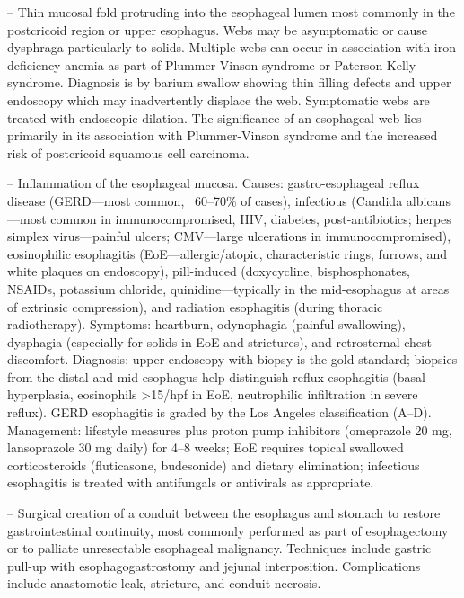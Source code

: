 -- Thin mucosal fold protruding into the esophageal lumen most commonly in the postcricoid region or upper esophagus. Webs may be asymptomatic or cause dysphraga particularly to solids. Multiple webs can occur in association with iron deficiency anemia as part of Plummer-Vinson syndrome or Paterson-Kelly syndrome. Diagnosis is by barium swallow showing thin filling defects and upper endoscopy which may inadvertently displace the web. Symptomatic webs are treated with endoscopic dilation. The significance of an esophageal web lies primarily in its association with Plummer-Vinson syndrome and the increased risk of postcricoid squamous cell carcinoma.

-- Inflammation of the esophageal mucosa. Causes: gastro-esophageal reflux disease (GERD—most common, ~60--70\% of cases), infectious (Candida albicans—most common in immunocompromised, HIV, diabetes, post-antibiotics; herpes simplex virus—painful ulcers; CMV—large ulcerations in immunocompromised), eosinophilic esophagitis (EoE—allergic/atopic, characteristic rings, furrows, and white plaques on endoscopy), pill-induced (doxycycline, bisphosphonates, NSAIDs, potassium chloride, quinidine—typically in the mid-esophagus at areas of extrinsic compression), and radiation esophagitis (during thoracic radiotherapy). Symptoms: heartburn, odynophagia (painful swallowing), dysphagia (especially for solids in EoE and strictures), and retrosternal chest discomfort. Diagnosis: upper endoscopy with biopsy is the gold standard; biopsies from the distal and mid-esophagus help distinguish reflux esophagitis (basal hyperplasia, eosinophils >15/hpf in EoE, neutrophilic infiltration in severe reflux). GERD esophagitis is graded by the Los Angeles classification (A--D). Management: lifestyle measures plus proton pump inhibitors (omeprazole 20 mg, lansoprazole 30 mg daily) for 4--8 weeks; EoE requires topical swallowed corticosteroids (fluticasone, budesonide) and dietary elimination; infectious esophagitis is treated with antifungals or antivirals as appropriate.

-- Surgical creation of a conduit between the esophagus and stomach to restore gastrointestinal continuity, most commonly performed as part of esophagectomy or to palliate unresectable esophageal malignancy. Techniques include gastric pull-up with esophagogastrostomy and jejunal interposition. Complications include anastomotic leak, stricture, and conduit necrosis.

